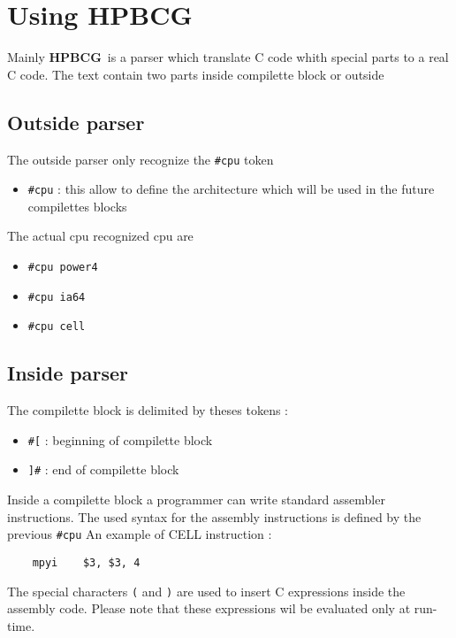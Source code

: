 \documentclass{article}
\newcommand{\hpbcg}{\textbf{HPBCG}\ }
\begin{document}
\section{Using \hpbcg}

Mainly \hpbcg is a parser which translate C code whith special parts
to a real C code. The text contain two parts inside compilette block
or outside

\subsection{Outside parser}

The outside parser only recognize the \verb|#cpu| token

\begin{itemize}
\item \verb|#cpu| : this allow to define the architecture which will be
  used in the future compilettes blocks
\end{itemize}

The actual cpu recognized cpu are 
\begin{itemize}
\item \verb|#cpu power4|
\item \verb|#cpu ia64|
\item \verb|#cpu cell|
\end{itemize}

\subsection{Inside parser}

The compilette block is delimited by theses tokens :  

\begin{itemize}
\item \verb|#[| : beginning of compilette block
\item \verb|]#| : end of compilette block
\end{itemize}

Inside a compilette block a programmer can write standard assembler
instructions. The used syntax for the assembly instructions is defined
by the previous \verb|#cpu| An example of CELL instruction :

\begin{verbatim}
	mpyi    $3, $3, 4
\end{verbatim}

The special characters \verb|(| and \verb|)| are used to insert C
expressions inside the assembly code. Please note that these
expressions wil be evaluated only at run-time.
\end{document}
